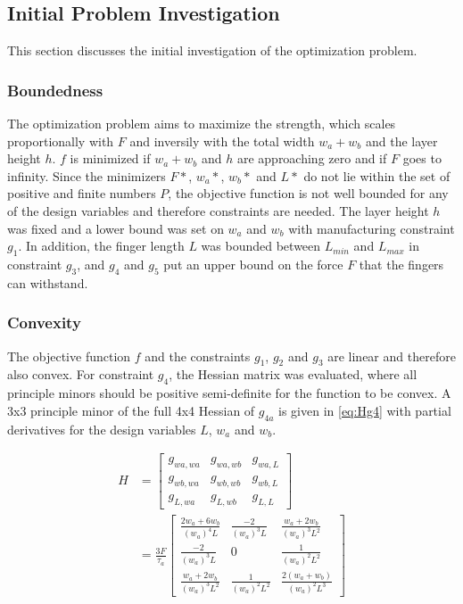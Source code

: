 \subsection{Initial Problem Investigation}
This section discusses the initial investigation of the optimization problem. 

\subsubsection{Boundedness}
The optimization problem aims to maximize the strength, which scales proportionally with $F$ and inversily with the total width $w_a + w_b$ and the layer height $h$.  $f$ is minimized if $w_a + w_b$ and $h$ are approaching zero and if $F$ goes to infinity. Since the minimizers $F*$, $w_a*$, $w_b*$ and $L*$ do not lie within the set of positive and finite numbers $P$, the objective function is not well bounded for any of the design variables and therefore constraints are needed. The layer height $h$ was fixed and a lower bound was set on $w_a$ and $w_b$ with manufacturing constraint $g_1$. In addition, the finger length $L$ was bounded between $L_{min}$ and $L_{max}$ in constraint $g_3$, and $g_4$ and $g_5$ put an upper bound on the force $F$ that the fingers can withstand. 

\subsubsection{Convexity}
The objective function $f$ and the constraints $g_1$, $g_2$ and $g_3$ are linear and therefore also convex. For constraint $g_4$, the Hessian matrix was evaluated, where all principle minors should be positive semi-definite for the function to be convex. A 3x3 principle minor of the full 4x4 Hessian of $g_{4a}$ is given in \autoref{eq:Hg4} with partial derivatives for the design variables $L$, $w_a$ and $w_b$.

\begin{align}
	\label{eq:Hg4}
	H &= \begin{bmatrix}
				 g_{wa, wa} & g_{wa, wb} & g_{wa, L} \\
				 g_{wb, wa} & g_{wb, wb} & g_{wb, L}  \\
				 g_{L, wa} & g_{L, wb} & g_{L, L} 													
		\end{bmatrix} \\
	&= \frac{3F}{\tau_a}\begin{bmatrix}
		\frac{2w_a + 6 w_b}{\left( w_a \right)^4 L} & \frac{-2}{\left( w_a \right)^3 L } &  \frac{w_a + 2 w_b}{\left( w_a \right)^3 L^2 }\\
		\frac{-2}{\left( w_a \right)^3 L } & 0 & \frac{1}{\left( w_a \right)^2 L^2 }  \\
\frac{w_a + 2 w_b}{\left( w_a \right)^3 L^2 } & \frac{1}{\left( w_a \right)^2 L^2 } & \frac{2 \left(w_a + w_b\right)}{\left( w_a \right)^2 L^3}													
	\end{bmatrix}
\end{align}

